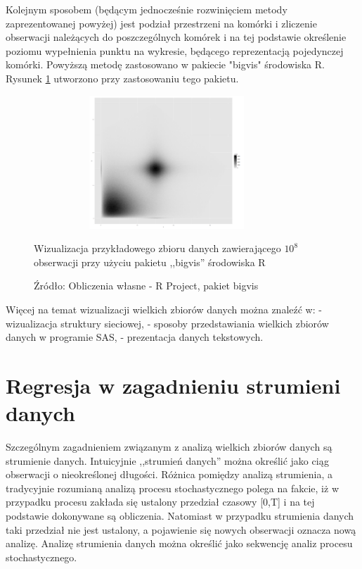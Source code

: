 \documentclass[man,mfu]{mgrwms}
\begin{document}
Kolejnym sposobem (będącym jednocześnie rozwinięciem metody zaprezentowanej powyżej) jest podział przestrzeni na komórki i zliczenie obserwacji należących do poszczególnych komórek i na tej podstawie określenie poziomu wypełnienia punktu na wykresie, będącego reprezentacją pojedynczej komórki. Powyższą metodę zastosowano w pakiecie "bigvis"\cite{bigvis} środowiska R. Rysunek \ref{bigvis2} utworzono przy zastosowaniu tego pakietu.

\begin{figure}[H]
\centering
\includegraphics[width=100mm,height = 50mm]{bigvisex}
\caption{Wizualizacja przykładowego zbioru danych zawierającego $10^8$ obserwacji przy użyciu pakietu ,,bigvis'' środowiska R}
\caption*{Źródło: Obliczenia własne - R Project, pakiet bigvis}
\label{bigvis2}
\end{figure}

Więcej na temat wizualizacji wielkich zbiorów danych można znaleźć w: \cite{graphprism} - wizualizacja struktury sieciowej, \cite{sas} - sposoby przedstawiania wielkich zbiorów danych w programie SAS, \cite{bigtext} - prezentacja danych tekstowych.

\chapter{Regresja w zagadnieniu strumieni danych}

Szczególnym zagadnieniem związanym z analizą wielkich zbiorów danych są strumienie danych. Intuicyjnie ,,strumień danych'' można określić jako ciąg obserwacji o nieokreślonej długości. Różnica pomiędzy analizą strumienia, a tradycyjnie rozumianą analizą procesu stochastycznego polega na fakcie, iż w przypadku procesu zakłada się ustalony przedział czasowy [0,T] i na tej podstawie dokonywane są obliczenia. Natomiast w przypadku strumienia danych taki przedział nie jest ustalony, a pojawienie się nowych obserwacji oznacza nową analizę. Analizę strumienia danych można określić jako sekwencję analiz procesu stochastycznego\cite{stream}.
\end{document}
